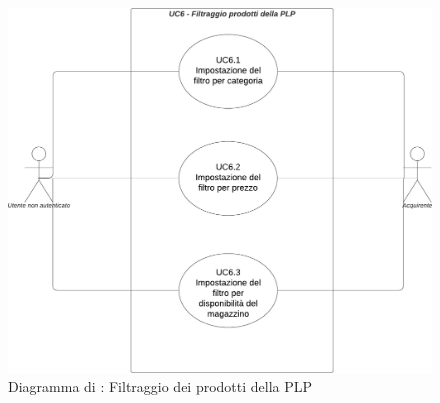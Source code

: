 \begin{figure}[H]
	\centering
	\includegraphics[scale=0.5]{Immagini/DiagrammiUC/UC6FiltraggioProdottiDellaPLP.png}
	\caption{Diagramma di \actualUC: Filtraggio dei prodotti della PLP} 
\end{figure}


